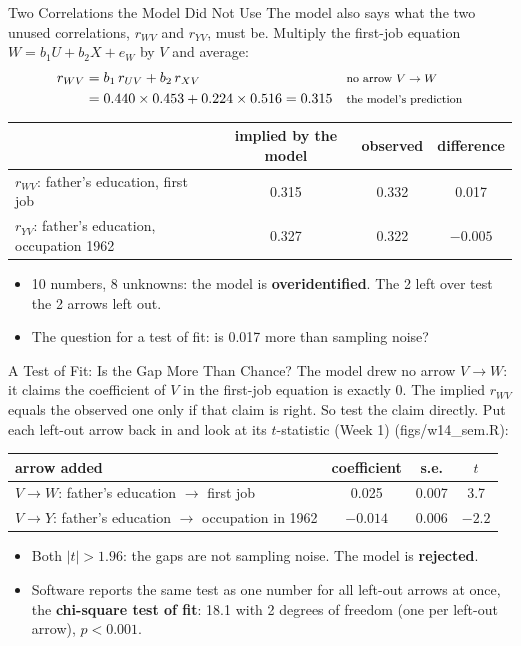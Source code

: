 \documentclass[aspectratio=169,11pt,xcolor=dvipsnames]{beamer}
\newcommand{\srcp}[1]{{\scriptsize\color{gray}(#1)}}
\begin{document}
\begin{frame}{Two Correlations the Model Did Not Use}
The model also says what the two unused correlations, $r_{WV}$ and $r_{YV}$, must be. Multiply the
first-job equation $W = b_1 U + b_2 X + e_W$ by $V$ and average:
\begin{align*}
  r_{WV} &= b_1\, r_{UV} + b_2\, r_{XV}
    && \text{\footnotesize no arrow $V \to W$} \\
         &= 0.440 \times 0.453 + 0.224 \times 0.516 = 0.315
    && \text{\footnotesize the model's prediction}
\end{align*}
\vskip-4pt
\begin{center}\small
\renewcommand{\arraystretch}{1.1}
\begin{tabular}{@{}lccc@{}}
\toprule
 & implied by the model & observed & difference \\
\midrule
$r_{WV}$: father's education, first job & 0.315 & 0.332 & 0.017 \\
$r_{YV}$: father's education, occupation 1962 & 0.327 & 0.322 & $-0.005$ \\
\bottomrule
\end{tabular}
\end{center}
\begin{itemize}\itemsep3pt
  \item 10 numbers, 8 unknowns: the model is \textbf{overidentified}. The 2 left over test the
        2 arrows left out.
  \item The question for a test of fit: is 0.017 more than sampling noise?
\end{itemize}
\end{frame}

\begin{frame}{A Test of Fit: Is the Gap More Than Chance?}
The model drew no arrow $V \to W$: it claims the coefficient of $V$ in the first-job equation is
exactly 0. The implied $r_{WV}$ equals the observed one only if that claim is right.
\vskip3pt
So test the claim directly. Put each left-out arrow back in and look at its $t$-statistic (Week 1)
\srcp{figs/w14\_sem.R}:
\begin{center}\small
\renewcommand{\arraystretch}{1.12}
\begin{tabular}{@{}lccc@{}}
\toprule
arrow added & coefficient & s.e. & $t$ \\
\midrule
$V \to W$: father's education $\to$ first job & 0.025 & 0.007 & 3.7 \\
$V \to Y$: father's education $\to$ occupation in 1962 & $-0.014$ & 0.006 & $-2.2$ \\
\bottomrule
\end{tabular}
\end{center}
\begin{itemize}\itemsep3pt
  \item Both $|t| > 1.96$: the gaps are not sampling noise. The model is \textbf{rejected}.
  \item Software reports the same test as one number for all left-out arrows at once, the
        \textbf{chi-square test of fit}: 18.1 with 2 degrees of freedom (one per left-out arrow),
        $p < 0.001$.
\end{itemize}
\end{frame}
\end{document}

